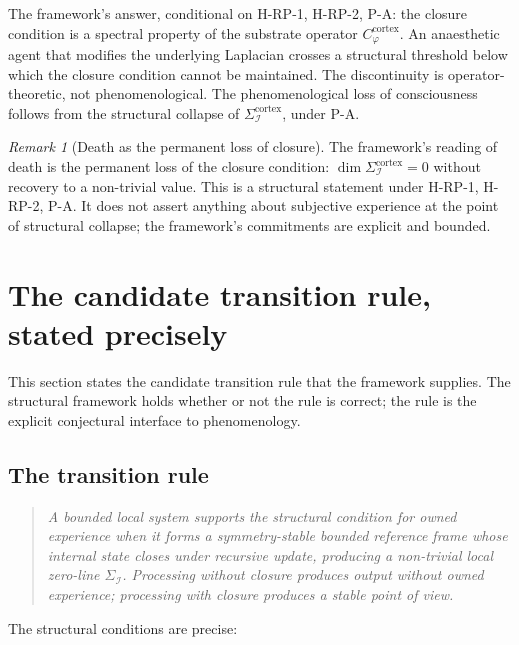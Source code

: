 \documentclass[11pt]{article}
\theoremstyle{plain}
\theoremstyle{definition}
\theoremstyle{remark}
\newtheorem{remark}[theorem]{Remark}
\newcommand{\Ical}{\mathcal{I}}
\newcommand{\Cph}{C_\varphi}
\begin{document}
The framework's answer, conditional on H-RP-1, H-RP-2, P-A: the closure condition is a spectral property of the substrate operator $\Cph^{\mathrm{cortex}}$. An anaesthetic agent that modifies the underlying Laplacian crosses a structural threshold below which the closure condition cannot be maintained. The discontinuity is operator-theoretic, not phenomenological. The phenomenological loss of consciousness follows from the structural collapse of $\Sigma_\Ical^{\mathrm{cortex}}$, under P-A.

\begin{remark}[Death as the permanent loss of closure]\label{rem:death-as-loss}
The framework's reading of death is the permanent loss of the closure condition: $\dim \Sigma_\Ical^{\mathrm{cortex}} = 0$ without recovery to a non-trivial value. This is a structural statement under H-RP-1, H-RP-2, P-A. It does not assert anything about subjective experience at the point of structural collapse; the framework's commitments are explicit and bounded.
\end{remark}

\section{The candidate transition rule, stated precisely}\label{sec:transition-rule}

This section states the candidate transition rule that the framework supplies. The structural framework holds whether or not the rule is correct; the rule is the explicit conjectural interface to phenomenology.

\subsection{The transition rule}

\begin{quote}
\textit{A bounded local system supports the structural condition for owned experience when it forms a symmetry-stable bounded reference frame whose internal state closes under recursive update, producing a non-trivial local zero-line $\Sigma_\Ical$. Processing without closure produces output without owned experience; processing with closure produces a stable point of view.}
\end{quote}

The structural conditions are precise:
\end{document}
